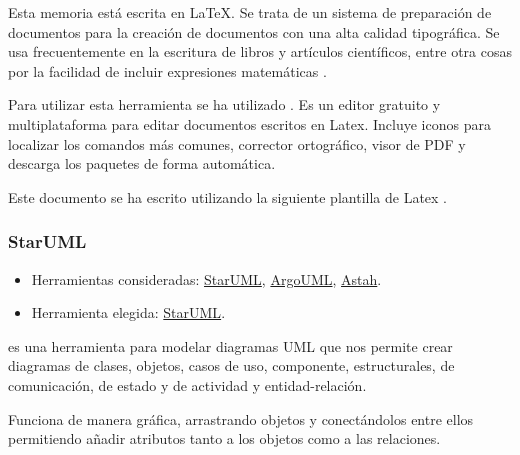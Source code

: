 Esta memoria está escrita en \LaTeX. Se trata de un sistema de preparación de documentos para la creación de documentos con una alta calidad tipográfica. Se usa frecuentemente en la escritura de libros y artículos científicos, entre otra cosas por la facilidad de incluir expresiones matemáticas \cite{wiki:latex} \cite{wiki:latexwikibooks}.

Para utilizar esta herramienta se ha utilizado . Es un editor gratuito y multiplataforma para editar documentos escritos en Latex. Incluye iconos para localizar los comandos más comunes, corrector ortográfico, visor de PDF y descarga los paquetes de forma automática.

Este documento se ha escrito utilizando la siguiente plantilla de Latex \cite{misc:plantillalatex}.

\subsubsection{StarUML}

\begin{itemize}
	\tightlist
	\item
	Herramientas consideradas:
	\href{http://staruml.io/}{StarUML}, 
	\href{http://argouml.tigris.org/}{ArgoUML},
	\href{http://astah.net/}{Astah}.
	\item
	Herramienta elegida:
	\href{http://staruml.io/}{StarUML}.
\end{itemize}

 es una herramienta para modelar diagramas UML que nos permite crear diagramas de clases, objetos, casos de uso, componente, estructurales, de comunicación, de estado y de actividad y entidad-relación.

Funciona de manera gráfica, arrastrando objetos y conectándolos entre ellos permitiendo añadir atributos tanto a los objetos como a las relaciones.
